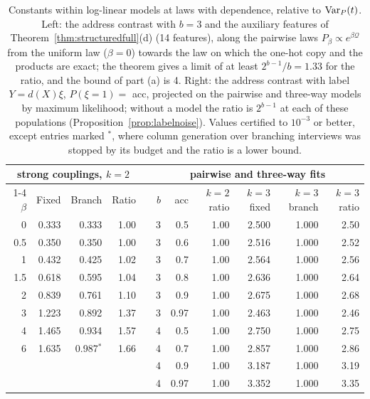 \begin{table}[h]
\centering
\caption{Constants within log-linear models at laws with dependence, relative to $\operatorname{Var}_P(t)$. Left: the address contrast with $b=3$ and the auxiliary features of Theorem~\ref{thm:structuredfull}(d) (14 features), along the pairwise laws $P_\beta\propto e^{\beta\mathcal Q}$ from the uniform law ($\beta=0$) towards the law on which the one-hot copy and the products are exact; the theorem gives a limit of at least $2^{b-1}/b=1.33$ for the ratio, and the bound of part (a) is 4. Right: the address contrast with label $Y=d(X)\xi$, $P(\xi=1)=$ acc, projected on the pairwise and three-way models by maximum likelihood; without a model the ratio is $2^{b-1}$ at each of these populations (Proposition~\ref{prop:labelnoise}). Values certified to $10^{-3}$ or better, except entries marked $^\ast$, where column generation over branching interviews was stopped by its budget and the ratio is a lower bound.}
\label{tab:dependence}
\small
\setlength{\tabcolsep}{4pt}
\begin{tabular}{rrrr c rrrrrr}
\toprule
\multicolumn{4}{c}{strong couplings, $k=2$} & & \multicolumn{6}{c}{pairwise and three-way fits} \\
\cmidrule{1-4}\cmidrule{6-11}
$\beta$ & Fixed & Branch & Ratio & & $b$ & acc & $k=2$ ratio & $k=3$ fixed & $k=3$ branch & $k=3$ ratio \\
\midrule
0 & 0.333 & 0.333 & 1.00 & & 3 & 0.5 & 1.00 & 2.500 & 1.000 & 2.50 \\
0.5 & 0.350 & 0.350 & 1.00 & & 3 & 0.6 & 1.00 & 2.516 & 1.000 & 2.52 \\
1 & 0.432 & 0.425 & 1.02 & & 3 & 0.7 & 1.00 & 2.564 & 1.000 & 2.56 \\
1.5 & 0.618 & 0.595 & 1.04 & & 3 & 0.8 & 1.00 & 2.636 & 1.000 & 2.64 \\
2 & 0.839 & 0.761 & 1.10 & & 3 & 0.9 & 1.00 & 2.675 & 1.000 & 2.68 \\
3 & 1.223 & 0.892 & 1.37 & & 3 & 0.97 & 1.00 & 2.463 & 1.000 & 2.46 \\
4 & 1.465 & 0.934 & 1.57 & & 4 & 0.5 & 1.00 & 2.750 & 1.000 & 2.75 \\
6 & 1.635 & 0.987$^\ast$ & 1.66 & & 4 & 0.7 & 1.00 & 2.857 & 1.000 & 2.86 \\
 & & &  & & 4 & 0.9 & 1.00 & 3.187 & 1.000 & 3.19 \\
 & & &  & & 4 & 0.97 & 1.00 & 3.352 & 1.000 & 3.35 \\
\bottomrule
\end{tabular}
\end{table}
